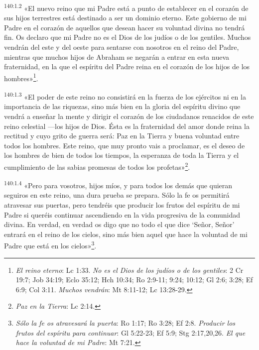 \par
\textsuperscript{140:1.2} «El nuevo reino que mi Padre está a punto de establecer en el corazón de sus hijos terrestres está destinado a ser un dominio eterno. Este gobierno de mi Padre en el corazón de aquellos que desean hacer su voluntad divina no tendrá fin. Os declaro que mi Padre no es el Dios de los judíos o de los gentiles. Muchos vendrán del este y del oeste para sentarse con nosotros en el reino del Padre, mientras que muchos hijos de Abraham se negarán a entrar en esta nueva fraternidad, en la que el espíritu del Padre reina en el corazón de los hijos de los hombres»\footnote{\textit{El reino eterno}: Lc 1:33. \textit{No es el Dios de los judíos o de los gentiles}: 2 Cr 19:7; Job 34:19; Eclo 35:12; Hch 10:34; Ro 2:9-11; 9:24; 10:12; Gl 2:6; 3:28; Ef 6:9; Col 3:11. \textit{Muchos vendrán}: Mt 8:11-12; Lc 13:28-29.}.

\par
\textsuperscript{140:1.3} «El poder de este reino no consistirá en la fuerza de los ejércitos ni en la importancia de las riquezas, sino más bien en la gloria del espíritu divino que vendrá a enseñar la mente y dirigir el corazón de los ciudadanos renacidos de este reino celestial ---los hijos de Dios. Ésta es la fraternidad del amor donde reina la rectitud y cuyo grito de guerra será: Paz en la Tierra y buena voluntad entre todos los hombres. Este reino, que muy pronto vais a proclamar, es el deseo de los hombres de bien de todos los tiempos, la esperanza de toda la Tierra y el cumplimiento de las sabias promesas de todos los profetas»\footnote{\textit{Paz en la Tierra}: Lc 2:14.}.

\par
\textsuperscript{140:1.4} «Pero para vosotros, hijos míos, y para todos los demás que quieran seguiros en este reino, una dura prueba se prepara. Sólo la fe os permitirá atravesar sus puertas, pero tendréis que producir los frutos del espíritu de mi Padre si queréis continuar ascendiendo en la vida progresiva de la comunidad divina. En verdad, en verdad os digo que no todo el que dice `Señor, Señor' entrará en el reino de los cielos, sino más bien aquel que hace la voluntad de mi Padre que está en los cielos»\footnote{\textit{Sólo la fe os atravesará la puerta}: Ro 1:17; Ro 3:28; Ef 2:8. \textit{Producir los frutos del espíritu para continuar}: Gl 5:22-23; Ef 5:9; Stg 2:17,20,26. \textit{El que hace la voluntad de mi Padre}: Mt 7:21.}.

